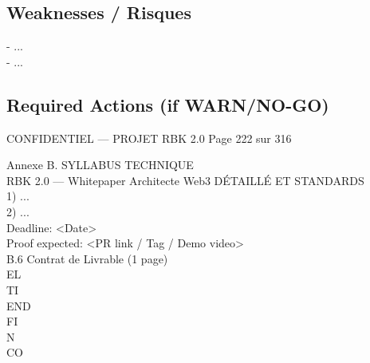 \subsection*{Weaknesses / Risques}
- ...\\
- ...\\
\vspace{0.5em}
\vspace{0.5em}
\subsection*{Required Actions (if WARN/NO-GO)}
\vspace{0.5em}
\vspace{0.5em}
\vspace{0.5em}
\vspace{0.5em}
\begin{confidential}CONFIDENTIEL — PROJET RBK 2.0                               Page 222 sur 316\end{confidential}
Annexe B. SYLLABUS TECHNIQUE\\
RBK 2.0 — Whitepaper Architecte Web3                                         DÉTAILLÉ ET STANDARDS\\
\vspace{0.5em}
\vspace{0.5em}
\vspace{0.5em}
1) ...\\
2) ...\\
\vspace{0.5em}
\vspace{0.5em}
Deadline: \textless{}Date\textgreater{}\\
Proof expected: \textless{}PR link / Tag / Demo video\textgreater{}\\
\vspace{0.5em}
\vspace{0.5em}
\vspace{0.5em}
\vspace{0.5em}
B.6 Contrat de Livrable (1 page)\\
\vspace{0.5em}
\vspace{0.5em}
\vspace{0.5em}
\vspace{0.5em}
EL\\
TI\\
END\\
FI\\
N\\
CO\\
\vspace{0.5em}
